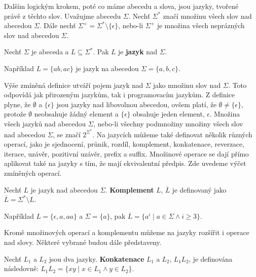 Dalším logickým krokem, poté co máme abecedu a slova, jsou jazyky, tvořené právě z těchto slov. Uvažujme abecedu $\Sigma$. Nechť $\Sigma^*$ značí množinu všech slov nad abecedou $\Sigma$. Dále nechť $\Sigma^+=\Sigma^* \setminus \{\epsilon\}$, nebo-li $\Sigma^+$ je množina všech neprázných slov nad abecedou $\Sigma$.

\begin{definition}
    Nechť $\Sigma$ je abeceda a $L\subseteq \Sigma^*$. Pak $L$ je \textbf{jazyk} nad $\Sigma$.
\end{definition}

\begin{example}
    Například $L=\{ ab,ac \}$ je jazyk na abecedou $\Sigma = \{ a,b,c \}$.
\end{example}

Výše zmíněná definice utváří pojem jazyk nad $\Sigma$ jako množinu slov nad $\Sigma$. Toto odpovídá jak přirozeným jazykům, tak i programovacím jazykům. Z definice plyne, že $\emptyset$ a $\{\epsilon \}$ jsou jazyky nad libovolnou abecedou, ovšem platí, že $\emptyset \neq \{ \epsilon \}$, protože $\emptyset$ neobsahuje žádný element a $\{ \epsilon \}$ obsahuje jeden element, $\epsilon$. Množina všech jazyků nad abecedou $\Sigma$, nebo-li všechny podmnožiny množiny všech slov nad abecedou $\Sigma$, se značí $2^{\Sigma^*}$. Na jazycích můžeme také definovat několik různých operací, jako je sjednocení, průnik, rozdíl, komplement, konkatenace, reverzace, iterace, uzávěr, pozitivní uzávěr, prefix a suffix. Množinové operace se dají přímo aplikovat také na jazyky s tím, že mají ekvivalentní předpis. Zde uvedeme výčet zmíněných operací.

\begin{definition}
    Nechť $L$ je jazyk nad abecedou $\Sigma$. \textbf{Komplement} $L$, $\overline{L}$ je definovaný jako $\overline{L}=\Sigma^* \setminus L$.
\end{definition}

\begin{example}
    Například $L=\{ \epsilon ,a,aa \}$ a $\Sigma = \{ a\}$, pak $\overline{L}=\{ a^i \mid a \in \Sigma \wedge i \ge 3 \}$.
\end{example}

Kromě množinových operací a komplementu můžeme na jazyky rozšířit i operace nad slovy. Některé vybrané budou dále představeny.

\begin{definition}
    Nechť $L_1$ a $L_2$ jsou dva jazyky. \textbf{Konkatenace} $L_1$ a $L_2$, $L_1 L_2$, je definována následovně: $L_1 L_2 = \{ xy \mid x \in L_1 \wedge y \in L_2 \}$.
\end{definition}


